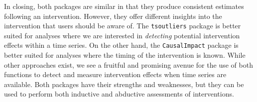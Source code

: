 \documentclass[12pt]{article}
\begin{document}
In closing, both packages are similar in that they produce consistent
estimates following an intervention. However, they offer different
insights into the intervention that users should be aware of. The
\texttt{tsoutliers} package is better suited for analyses where we are
interested in \emph{detecting} potential intervention effects within a
time series. On the other hand, the \texttt{CausalImpact} package is
better suited for analyses where the timing of the intervention is
known. While other approaches exist, we see a fruitful and promising
avenue for the use of both functions to detect and measure intervention
effects when time series are available. Both packages have their
strengths and weaknesses, but they can be used to perform both inductive
and abductive assessments of interventions.



\end{document}
